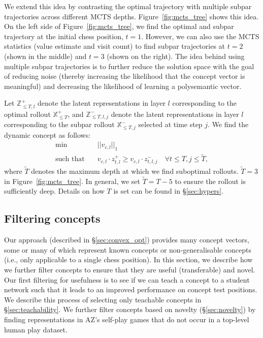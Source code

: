 \documentclass{article}
\def\Xset{\mathbb{X}}
\def\Zset{\mathbb{Z}}
\def\vcld{v_{c,l}\cdot}
\def\vcl{v_{c,l}}
\def\xp{\Xset^+_{\leq T}}
\def\xmj{\Xset^-_{\leq T,j}}
\def\zp{\Zset^+_{\leq T,l}}
\def\zmj{\Zset^-_{\leq T,l,j}}
\begin{document}
We extend this idea by contrasting the optimal trajectory with multiple subpar trajectories across different MCTS depths.
Figure~\ref{fig:mcts_tree} shows this idea. 
On the left side of Figure~\ref{fig:mcts_tree}, we find the optimal and subpar trajectory at the initial chess position, $t=1$. However, we can also use the MCTS statistics (value estimate and visit count) to find subpar trajectories at $t=2$ (shown in the middle) and $t=3$ (shown on the right). 
The idea behind using multiple subpar trajectories is to further reduce the solution space with the goal of reducing noise (thereby increasing the likelihood that the concept vector is meaningful) and decreasing the likelihood of learning a polysemantic vector. 

Let $\zp$ denote the latent representations in layer $l$ corresponding to the optimal rollout $\xp$, and $\zmj$ denote the latent representations in layer $l$ corresponding to the subpar rollout $\xmj$ selected at time step $j$.
We find the dynamic concept as follows:
\begin{align} \label{eq:tree_formula}
 \min & \quad ||\vcl||_1 \\
 \textrm{such that} & \quad \vcld z^+_{t,l} \geq \vcld z^{-}_{t,l,j} \quad \forall t \leq T, j \leq \tilde{T}  \nonumber,
 \nonumber
\end{align}
where $\tilde{T}$ denotes the maximum depth at which we find suboptimal rollouts. $\tilde{T} =3$ in Figure~\ref{fig:mcts_tree}. In general, we set $\tilde{T} = T-5$ to ensure the rollout is sufficiently deep. 
Details on how $T$ is set can be found in \S\ref{sec:hypers}. 

\subsection{Filtering concepts\label{sec:filtering}}
Our approach (described in \S\ref{sec:convex_opt}) provides many concept vectors, some or many of which represent known concepts or non-generalisable concepts (i.e., only applicable to a single chess position). In this section, we describe how we further filter concepts to ensure that they are useful (transferable) and novel. Our first filtering for usefulness is to see if we can teach a concept to a student network such that it leads to an improved performance on concept test positions. We describe this process of selecting only teachable concepts in \S\ref{sec:teachability}.
We further filter concepts based on novelty (\S\ref{sec:novelty}) by finding representations in AZ's self-play games that do not occur in a top-level human play dataset.
\end{document}
